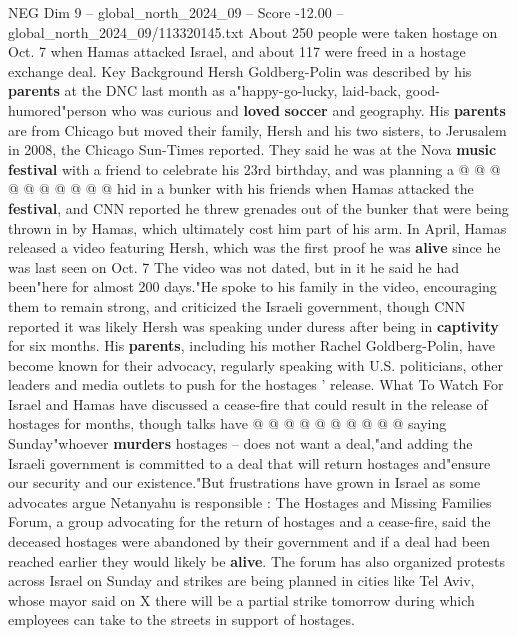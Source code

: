 \begin{textsample}{NEG Dim 9 – global\_north\_2024\_09 – Score -12.00 – global\_north\_2024\_09/113320145.txt}
About 250 people were taken hostage on Oct. 7 when Hamas attacked Israel, and about 117 were freed in a hostage exchange deal.
Key Background Hersh Goldberg-Polin was described by his \textbf{parents} at the DNC last month as a"happy-go-lucky, laid-back, good-humored"person who was curious and \textbf{loved} \textbf{soccer} and geography.
His \textbf{parents} are from Chicago but moved their family, Hersh and his two sisters, to Jerusalem in 2008, the Chicago Sun-Times reported.
They said he was at the Nova \textbf{music} \textbf{festival} with a friend to celebrate his 23rd birthday, and was planning a @ @ @ @ @ @ @ @ @ @ hid in a bunker with his friends when Hamas attacked the \textbf{festival}, and CNN reported he threw grenades out of the bunker that were being thrown in by Hamas, which ultimately cost him part of his arm.
In April, Hamas released a video featuring Hersh, which was the first proof he was \textbf{alive} since he was last seen on Oct. 7 The video was not dated, but in it he said he had been"here for almost 200 days."He spoke to his family in the video, encouraging them to remain strong, and criticized the Israeli government, though CNN reported it was likely Hersh was speaking under duress after being in \textbf{captivity} for six months.
His \textbf{parents}, including his mother Rachel Goldberg-Polin, have become known for their advocacy, regularly speaking with U.S. politicians, other leaders and media outlets to push for the hostages ' release.
What To Watch For Israel and Hamas have discussed a cease-fire that could result in the release of hostages for months, though talks have @ @ @ @ @ @ @ @ @ @ saying Sunday"whoever \textbf{murders} hostages -- does not want a deal,"and adding the Israeli government is committed to a deal that will return hostages and"ensure our security and our existence."But frustrations have grown in Israel as some advocates argue Netanyahu is responsible : The Hostages and Missing Families Forum, a group advocating for the return of hostages and a cease-fire, said the deceased hostages were abandoned by their government and if a deal had been reached earlier they would likely be \textbf{alive}.
The forum has also organized protests across Israel on Sunday and strikes are being planned in cities like Tel Aviv, whose mayor said on X there will be a partial strike tomorrow during which employees can take to the streets in support of hostages.

\end{textsample}
